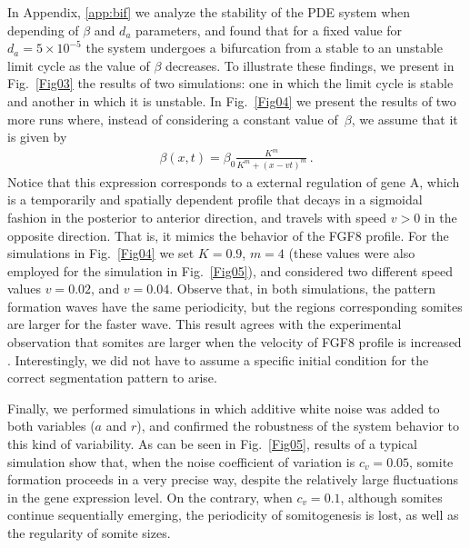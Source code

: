 \documentclass[11pt]{article}
\begin{document}
	In Appendix, \ref{app:bif} we analyze the stability of the PDE system when 
	depending of $\beta$ and $d_a$ parameters, and found that for a fixed value 
	for $d_a=5\times10^{-5}$ the system undergoes a bifurcation	from a stable to 
	an unstable limit cycle as the value of $\beta$ decreases. To illustrate these 
	findings, we present in Fig.~\ref{Fig03} the results of two
	simulations: one in which the limit cycle is stable and another in which it is
	unstable. In Fig.~\ref{Fig04} we present the results of two more runs where,
	instead of considering a constant value of~$\beta$, we assume that it is given
	by 
	\begin{gather}\label{eqbeta}
	\beta(x, t) = \beta_0 \frac{K^m}{K^m + (x - v t)^m}\,.
	\end{gather}
	Notice that this expression corresponds to a external regulation of gene A, which 
	is a temporarily and spatially dependent profile that decays in a sigmoidal 
	fashion in the posterior to anterior direction, and travels with speed
	$v>0$ in the opposite direction. That is, it mimics the behavior of the FGF8
	profile. For the simulations in Fig.~\ref{Fig04} we set $K =0.9 $, $m = 4 $
	(these values were also employed for the simulation in Fig.~\ref{Fig05}), and
	considered two different speed values $v = 0.02 $, and $v = 0.04$. Observe that, in
	both simulations, the pattern formation waves have the same periodicity, but the
	regions corresponding somites are larger for the faster wave. This result agrees
	with the experimental observation that somites are	larger when the velocity of 
	FGF8 profile is increased \citep{Sawada2001}. Interestingly, we did not have to 
	assume a specific initial condition for the correct segmentation pattern to arise.
	
	Finally, we performed simulations in which additive white noise was added to
	both variables ($a$ and $r$), and confirmed the robustness of the system
	behavior to this kind of variability. As can be seen in Fig.~\ref{Fig05},
	results of a typical simulation show that, when the noise coefficient of
	variation is $c_v = 0.05$, somite formation proceeds in a very precise way,
	despite the relatively large fluctuations in the gene expression level. On the
	contrary, when $c_v = 0.1$, although somites continue sequentially emerging, the
	periodicity of somitogenesis is lost, as well as the regularity of somite sizes.
	
\end{document}
